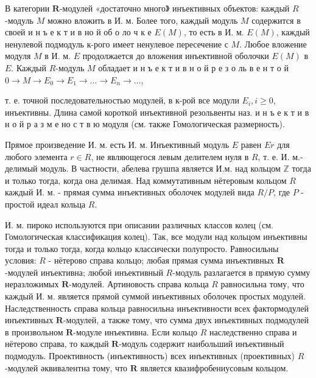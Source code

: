\documentclass[10pt]{article}
\begin{document}
В категории $\boldsymbol{R}$-модулей «достаточно много》 инъективных объектов: каждый $R$-модуль $M$ можно вложить в И. м. Более того, каждый модуль $M$ содержится в своей и н ъ е к т и в но й об о ло ч к е $E(M)$, то есть в И. м. $E(M)$, каждый ненулевой подмодуль к-рого имеет ненулевое пересечение с $M$. Любое вложение модуля $M$ в И. м. $E$ продолжается до вложения инъективной оболочки $E(M)$ в $E$. Каждый $R$-модуль $M$ обладает и н ъ е к т и в н о й р е з о ль в е н т о й $0 \longrightarrow M \longrightarrow E_{0} \longrightarrow E_{1} \longrightarrow \ldots \rightarrow E_{n} \rightarrow \ldots$,



т. е. точной последовательностью модулей, в к-рой все модули $E_{i}, i \geqslant 0$, инъективны. Длина самой короткой инъективной резольвенты наз. и н ъ е к т и в н о й р а з м е но с т в ю модуля (см. также Гомологическая размерность).



Прямое произведение И. м. есть И. м. Инъективный модуль $E$ равен $E r$ для любого элемента $r \in R$, не являющегося левым делителем нуля в $R$, т. е. И. м.- делимый модуль. В частности, абелева грушпа является И.м. над кольцом $\mathbb{Z}$ тогда и только тогда, когда она делимая. Над коммутативным нётеровым кольцом $R$ каждый И. м. - прямая сумма инъективных оболочек модулей вида $R / P$, где $P$ - простой идеал кольца $R$.



И. м. пироко используются при описании различных классов колец (см. Гомологическая классификация колец). Так, все модули над кольцом инъективны тогда и только тогда, когда кольцо классически полупросто. Равносильны условия: $R$ - нётерово справа кольцо; любая прямая сумма инъективных $\boldsymbol{R}$-модулей инъективна; любой инъективный $R$-модуль разлагается в прямую сумму неразложимых $\boldsymbol{R}$-модулей. Артиновость справа кольца $R$ равносильна тому, что каждый И. м. является прямой суммой инъективных оболочек простых модулей. Наследственность справа кольца равносильна инъективности всех фактормодулей инъективных $\boldsymbol{R}$-модулей, а также тому, что сумма двух инъективных подмодулей в произвольном $\boldsymbol{R}$-модуле инъективна. Если кольцо $R$ наследственно справа и нётерово справа, то каждый $\boldsymbol{R}$-модуль содержит наибольший инъективный подмодуль. Проективность (инъективность) всех инъективных (проективных) $R$-модулей әквивалентна тому, что $\boldsymbol{R}$ является квазифробениусовым кольцом.
\end{document}
